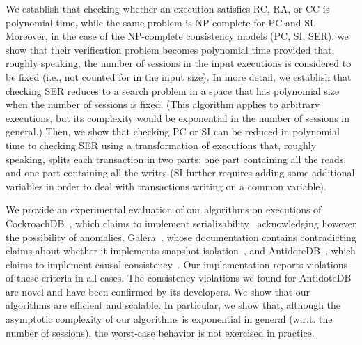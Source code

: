 We establish that checking whether an execution satisfies RC, RA, or CC is polynomial time, while the same problem is NP-complete for PC and SI. Moreover, in the case of the NP-complete consistency models (PC, SI, SER), we show that their verification problem becomes polynomial time provided that, roughly speaking, the number of sessions in the input executions is considered to be fixed (i.e., not counted for in the input size). In more detail, we establish that checking SER reduces to a search problem in a space that has polynomial size when the number of sessions is fixed. (This algorithm applies to arbitrary executions, but its complexity would be exponential in the number of sessions in general.) Then, we show that checking PC or SI can be reduced in polynomial time to checking SER using a transformation of executions that, roughly speaking, splits each transaction in two parts: one part containing all the reads, and one part containing all the writes (SI further requires adding some additional variables in order to deal with transactions writing on a common variable).


We provide an experimental evaluation of our algorithms on executions of CockroachDB~\cite{cockroach}, which claims to implement serializability~\cite{cockroach-claim} acknowledging however the possibility of anomalies, Galera~\cite{galera}, whose documentation contains contradicting claims about whether it implements snapshot isolation~\cite{galera-claim,galera-notclaim}, and AntidoteDB~\cite{antidote}, which claims to implement causal consistency~\cite{antidote-claim}.
Our implementation reports violations of these criteria in all cases. 
The consistency violations we found for AntidoteDB are novel and have been confirmed by its developers. We show that our algorithms are efficient and scalable.
In particular, we show that, although the asymptotic complexity of our algorithms is exponential in general (w.r.t. the number of sessions), the worst-case behavior is not exercised in practice.


